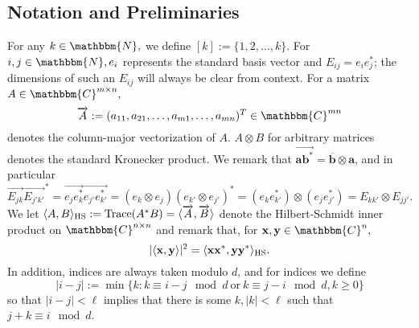 \documentclass[]{spie}  %
\def \vec{\overrightarrow}
\def \a {\mathbf a}
\def \b {\mathbf b}
\def \bar {\overline}
\def \x {\mathbf x}
\def \y {\mathbf y}
\def \C {\mathbbm{C}}
\def \N {\mathbbm{N}}
\def \HS {\rm HS}
\DeclareMathOperator{\Tr}{\rm Trace}
\begin{document}
\subsection*{Notation and Preliminaries}

 For any $k \in \N,$ we define $[k] := \{1, 2, \ldots, k\}$.  For $i, j \in \N, e_i$ represents the standard basis vector and $E_{ij} = e_i e_j^*$; the dimensions of such an $E_{ij}$ will always be clear from context.  For a matrix $A \in \C^{m \times n},$ $$\vec{A} := (a_{11}, a_{21}, \ldots, a_{m1}, \ldots, a_{mn})^T \in \C^{mn}$$ denotes the column-major vectorization of $A$.  $A \otimes B$ for arbitrary matrices denotes the standard Kronecker product.  We remark that $\vec{\a\b^*} = \bar{\b} \otimes \a$, and in particular%
\begin{equation}
  \vec{E_{jk}} \vec{E_{j'k'}}^* = \vec{e_j e_k^*} \vec{e_{j'} e_{k'}^*} = (e_k \otimes e_j) (e_{k'} \otimes e_{j'})^* = (e_k e_{k'}^*) \otimes (e_j e_{j'}^*) = E_{kk'} \otimes E_{jj'}.
  \label{id:kronsimp}
\end{equation} We let $\langle A, B \rangle_{\HS} := \Tr(A^* B) = \langle \vec{A}, \vec{B} \rangle$ denote the Hilbert-Schmidt inner product on $\C^{n \times n}$ and remark that, for $\x, \y \in \C^n,$ %
  \begin{equation}%
    |\langle \x, \y \rangle |^2 = \langle \x \x^*, \y \y^* \rangle_{\HS}.%
    \label{id:quadprod}%
  \end{equation}%
%
  In addition, indices are always taken modulo $d$, and for indices we define \begin{equation} |i - j| := \min \{k : k \equiv i - j \mod d \ \text{or} \ k \equiv j - i \mod d, k \ge 0\} \label{eq:modabs} \end{equation} so that $|i - j| < \ell$ implies that there is some $k, |k| < \ell$ such that $j + k \equiv i \mod d$.
\end{document}
